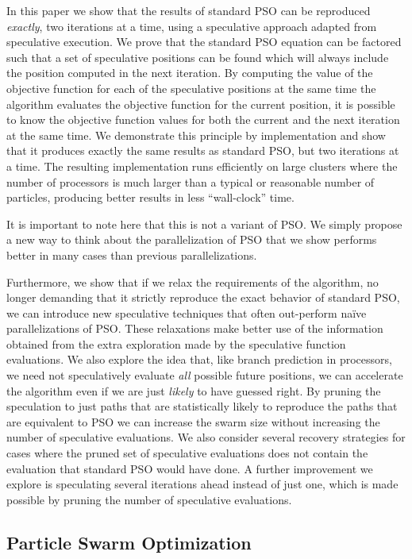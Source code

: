 \documentclass[ms]{byuprop}
\begin{document}
In this paper we show that the results of standard PSO can be reproduced
\emph{exactly}, two iterations at a time, using a speculative approach adapted
from speculative execution. We prove that the standard PSO equation can be
factored such that a set of speculative positions can be found which will
always include the position computed in the next iteration.  By computing the
value of the objective function for each of the speculative positions at the
same time the algorithm evaluates the objective function for the current
position, it is possible to know the objective function values for both the
current and the next iteration at the same time.  We demonstrate this principle
by implementation and show that it produces exactly the same results as
standard PSO, but two iterations at a time.  The resulting implementation runs
efficiently on large clusters where the number of processors is much larger
than a typical or reasonable number of particles, producing better results in
less ``wall-clock'' time.

It is important to note here that this is not a variant of PSO.  We simply
propose a new way to think about the parallelization of PSO that we show
performs better in many cases than previous parallelizations.

Furthermore, we show that if we relax the requirements of the algorithm, no
longer demanding that it strictly reproduce the exact behavior of standard PSO,
we can introduce new speculative techniques that often out-perform na\"ive
parallelizations of PSO.  These relaxations make better use of the information
obtained from the extra exploration made by the speculative function
evaluations.  We also explore the idea that, like branch prediction in
processors, we need not speculatively evaluate \emph{all} possible future
positions, we can accelerate the algorithm even if we are just \emph{likely} to
have guessed right.  By pruning the speculation to just paths that are
statistically likely to reproduce the paths that are equivalent to PSO we can
increase the swarm size without increasing the number of speculative
evaluations.  We also consider several recovery strategies for cases where the
pruned set of speculative evaluations does not contain the evaluation that
standard PSO would have done.  A further improvement we explore is speculating
several iterations ahead instead of just one, which is made possible by pruning
the number of speculative evaluations.

\subsection{Particle Swarm Optimization}
\label{sec:pso}
\end{document}
